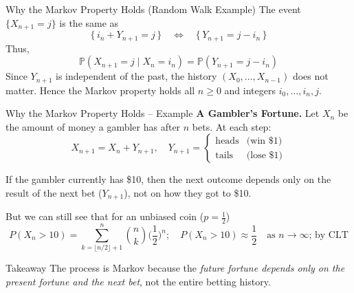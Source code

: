 \documentclass[8pt]{beamer}
\begin{document}
\begin{frame}{Why the Markov Property Holds (Random Walk Example)}
The event $\{X_{n+1}=j\}$ is the same as
\begin{equation*}
\{\,i_n + Y_{n+1} = j\,\} 
\quad \Longleftrightarrow \quad
\{\,Y_{n+1} = j - i_n\,\}
\end{equation*}
Thus,
\begin{equation*}
\mathbb{P}(X_{n+1}=j \mid X_n=i_n) 
= \mathbb{P}(Y_{n+1}=j-i_n)
\end{equation*}
Since $Y_{n+1}$ is independent of the past, the history $(X_0,\dots,X_{n-1})$ does not matter. Hence the Markov property holds all \(n\ge0\) and integers \(i_0,\dots,i_n,j\). 
\end{frame}

\begin{frame}{Why the Markov Property Holds -- Example}
\textbf{A Gambler's Fortune.}  
Let $X_n$ be the amount of money a gambler has after $n$ bets.  
At each step:
\begin{equation*}
X_{n+1} = X_n + Y_{n+1}, \quad 
Y_{n+1} =
\begin{cases}
\text{heads} & \text{(win \$1)} \\
\text{tails} & \text{(lose \$1)} 
\end{cases}
\end{equation*}

If the gambler currently has \$10, then the next outcome depends only on the result of the next bet ($Y_{n+1}$), not on how they got to \$10.  

But we can still see that for an unbiased coin ($p = \frac{1}{2}$)
\begin{equation*}
P(X_{n} > 10) = \sum_{k = \lfloor n/2 \rfloor + 1}^{n} \binom{n}{k}\biggl(\frac{1}{2}\biggl)^{n}; \quad P(X_{n} > 10) \approx \frac{1}{2} \quad \text{as $n \rightarrow \infty $; by CLT}
\end{equation*}

\begin{block}{Takeaway}
The process is Markov because the \emph{future fortune depends only on the present fortune and the next bet}, not the entire betting history.
\end{block}
\end{frame}
\end{document}
